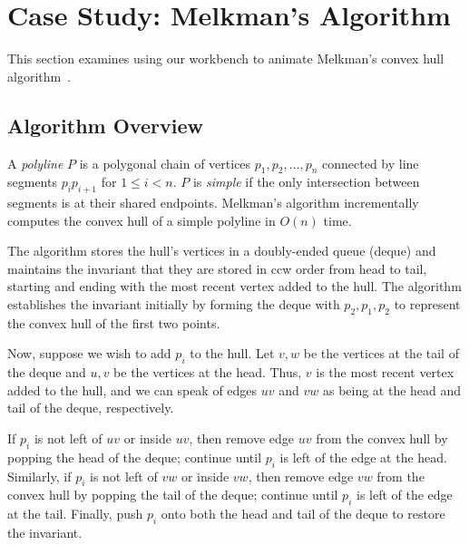 
\FloatBarrier
\section{Case Study: Melkman's Algorithm}

This section examines using our workbench to animate Melkman's convex hull
algorithm~\cite{melkman1987line}. 


\subsection{Algorithm Overview}

A \emph{polyline} $P$ is a polygonal chain of vertices $p_1, p_2, \ldots, p_n$
connected by line segments $p_ip_{i+1}$ for $1 \leq i < n$. $P$ is \emph{simple}
if the only intersection between segments is at their shared endpoints.
Melkman's algorithm incrementally computes the convex hull of a simple polyline
in $O(n)$ time. 

The algorithm stores the hull's vertices in a doubly-ended queue (deque) and
maintains the invariant that they are stored in ccw order from head to tail,
starting and ending with the most recent vertex added to the hull. The algorithm
establishes the invariant initially by forming the deque with $p_2, p_1, p_2$ to
represent the convex hull of the first two points. 


Now, suppose we wish to add $p_i$ to the hull. Let $v, w$ be the vertices at the
tail of the deque and $u, v$ be the vertices at the head. Thus, $v$ is the most
recent vertex added to the hull, and we can speak of edges $uv$ and $vw$ as
being at the head and tail of the deque, respectively. 


If $p_i$ is not left of $uv$ or inside $uv$, then remove edge $uv$ from the
convex hull by popping the head of the deque; continue until $p_i$ is left of
the edge at the head. Similarly, if $p_i$ is not left of $vw$ or inside $vw$,
then remove edge $vw$ from the convex hull by popping the tail of the deque;
continue until $p_i$ is left of the edge at the tail. Finally, push $p_i$ onto
both the head and tail of the deque to restore the invariant.


